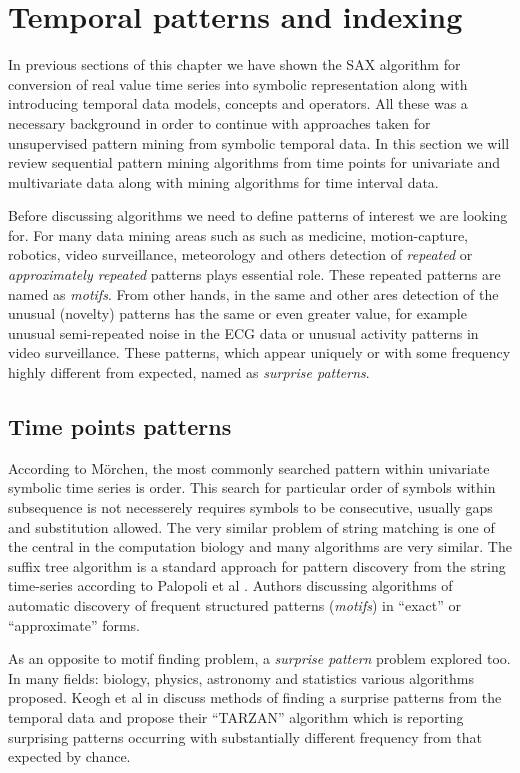 \section{Temporal patterns and indexing} \label{tpatterns}
In previous sections of this chapter we have shown the SAX algorithm for conversion of real value time series into symbolic representation along with introducing temporal data models, concepts and operators. All these was a necessary background in order to continue with approaches taken for unsupervised pattern mining from symbolic temporal data. In this section we will review sequential pattern mining algorithms from time points for univariate and multivariate data along with mining algorithms for time interval data.

Before discussing algorithms we need to define patterns of interest we are looking for. For many data mining areas such as such as medicine, motion-capture, robotics, video surveillance, meteorology and others detection of \textit{repeated} or \textit{approximately repeated} patterns plays essential role. These repeated patterns are named as \textit{motifs}. From other hands, in the same and other ares detection of the unusual (novelty) patterns has the same or even greater value, for example unusual semi-repeated noise in the ECG data or unusual activity patterns in video surveillance. These patterns, which appear uniquely or with some frequency highly different from expected, named as \textit{surprise patterns}.


\subsection{Time points patterns}
According to M\"orchen, the most commonly searched pattern within univariate symbolic time series is order. This search for particular order of symbols within subsequence is not necesserely requires symbols to be consecutive, usually gaps and substitution allowed. The very similar problem of string matching is one of the central in the computation biology \cite{citeulike:465665} and many algorithms are very similar. The suffix tree algorithm is a standard approach for pattern discovery from the string time-series according to Palopoli et al \cite{citeulike:5003338}. Authors discussing algorithms of automatic discovery of frequent structured patterns (\textit{motifs}) in ``exact'' or ``approximate'' forms. 

As an opposite to motif finding problem, a \textit{surprise pattern} problem explored too. In many fields: biology, physics, astronomy and statistics various algorithms proposed. Keogh et al in \cite{citeulike:3025877} discuss methods of finding a surprise patterns from the temporal data and propose their ``TARZAN'' algorithm which is reporting surprising patterns occurring with substantially different frequency from that expected by chance.